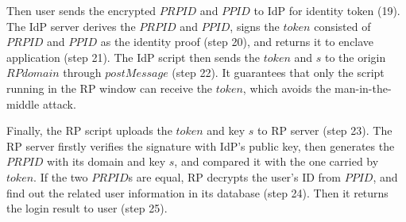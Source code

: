 Then user sends the encrypted $PRPID$ and $PPID$ to IdP for identity token (19). 
The IdP server derives the $PRPID$ and $PPID$, signs the $token$ consisted of $PRPID$ and $PPID$ as the identity proof (step 20), and returns it to enclave application (step 21). 
The IdP script then sends the $token$ and $s$ to the origin $RPdomain$ through $postMessage$ (step 22). It guarantees that only the script running in the RP window can receive the $token$, which avoids the man-in-the-middle attack.

Finally, the RP script uploads the $token$ and key $s$ to RP server (step 23). The RP server firstly verifies the signature with IdP's public key, then generates the $PRPID$ with its domain and key $s$, and compared it with the one carried by $token$. If the two $PRPID$s are equal, RP decrypts the user's ID from $PPID$, and find out the related user information in its database (step 24). Then it returns the login result to user (step 25). 